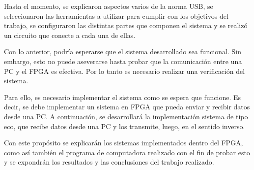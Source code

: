 %
%

%
%
%



Hasta el momento, se explicaron aspectos varios de la norma USB, se seleccionaron las herramientas a utilizar para cumplir con los objetivos del trabajo, se configuraron las distintas partes que componen el sistema y se realizó un circuito que conecte a cada una de ellas.

Con lo anterior, podría esperarse que el sistema desarrollado sea funcional. Sin embargo, esto no puede aseverarse hasta probar que la comunicación entre una PC y el FPGA es efectiva. Por lo tanto es necesario realizar una verificación del sistema.

Para ello, es necesario implementar el sistema como se espera que funcione. Es decir, se debe implementar un sistema en FPGA que pueda enviar y recibir datos desde una PC. A continuación, se desarrollará la implementación sistema de tipo eco, que recibe datos desde una PC y los transmite, luego, en el sentido inverso.

Con este propósito se explicarán los sistemas implementados dentro del FPGA, como así también el programa de computadora realizado con el fin de probar esto y se expondrán los resultados y las conclusiones del trabajo realizado.